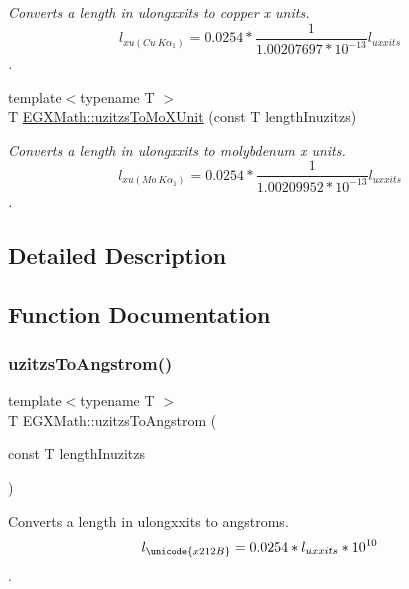 \begin{DoxyCompactItemize}
\begin{DoxyCompactList}\small\item\em Converts a length in ulongxxits to copper x units. \[ l_{xu(Cu\ K\alpha_1)}=0.0254 * \frac{1}{1.00207697*10^{-13}} l_{uxxits}\]. \end{DoxyCompactList}\item 
{\footnotesize template$<$typename T $>$ }\\T \mbox{\hyperlink{group___e_g_x_math-_conversions-_length_conversions-_imperial-uzitzs-_non-_s_i_ga64b556911b0bb06cf315aa02f5e2d379}{E\+G\+X\+Math\+::uzitzs\+To\+Mo\+X\+Unit}} (const T length\+Inuzitzs)
\begin{DoxyCompactList}\small\item\em Converts a length in ulongxxits to molybdenum x units. \[ l_{xu(Mo\ K\alpha_1)}=0.0254 * \frac{1}{1.00209952*10^{-13}} l_{uxxits}\]. \end{DoxyCompactList}\end{DoxyCompactItemize}


\subsection{Detailed Description}


\subsection{Function Documentation}
\mbox{\label{group___e_g_x_math-_conversions-_length_conversions-_imperial-uzitzs-_non-_s_i_gaaaecee65b1db5abcc71e18526e7073eb}} 
\subsubsection{\texorpdfstring{uzitzs\+To\+Angstrom()}{uzitzsToAngstrom()}}
{\footnotesize\ttfamily template$<$typename T $>$ \\
T E\+G\+X\+Math\+::uzitzs\+To\+Angstrom (\begin{DoxyParamCaption}\item[{const T}]{length\+Inuzitzs }\end{DoxyParamCaption})}



Converts a length in ulongxxits to angstroms. \[ l_{\unicode{x212B}}=0.0254 * l_{uxxits} * 10^{10} \]. 

